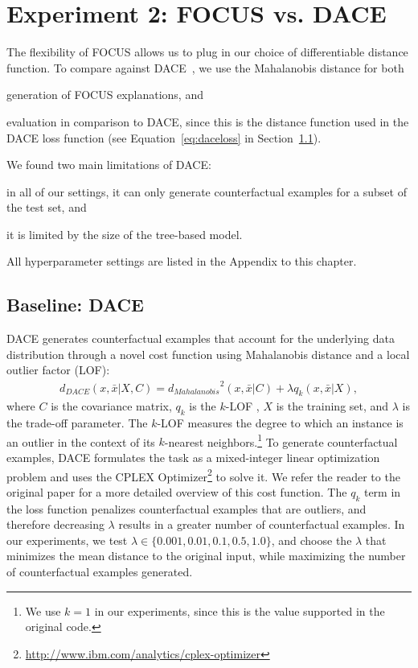 

\section{Experiment 2: FOCUS vs. DACE}
\label{section:experiment2}
The flexibility of FOCUS allows us to plug in our choice of differentiable distance function. To compare against DACE~\citep{kanamori_dace_2020}, we use the Mahalanobis distance for both 
\begin{inparaenum}[(i)]
\item generation of FOCUS explanations, and
\item evaluation in comparison to DACE, since this is the distance function used in the DACE loss function (see Equation~\ref{eq:daceloss} in Section~\ref{section:baselinedace}). 
\end{inparaenum}

We found two main limitations of DACE:
\begin{inparaenum}[(i)]
	\item in all of our settings, it can only generate counterfactual examples for a subset of the test set, and
	\item it is limited by the size of the tree-based model. 
\end{inparaenum}
All hyperparameter settings are listed in the Appendix to this chapter. 


\subsection{Baseline: DACE}
\label{section:baselinedace}
DACE generates counterfactual examples that account for the underlying data distribution through a novel cost function using Mahalanobis distance and a local outlier factor (LOF):
\begin{align}
\label{eq:daceloss}
d_\mathit{DACE}(x, \bar{x}|X, C) = {d_\mathit{Mahalanobis}}^2(x, \bar{x}|C) + \lambda q_k(x, \bar{x}|X), 
\end{align}
where $C$ is the covariance matrix, $q_k$ is the $k$-LOF \citep{breunig_lof_2020}, $X$ is the training set, and $\lambda$ is the trade-off parameter. 
The $k$-LOF measures the degree to which an instance is an outlier in the context of its $k$-nearest neighbors.\footnote{We use $k=1$ in our experiments, since this is the value supported in the original code.}
To generate counterfactual examples, DACE formulates the task as a mixed-integer linear optimization problem and uses the CPLEX Optimizer\footnote{\url{http://www.ibm.com/analytics/cplex-optimizer}} to solve it. 
We refer the reader to the original paper for a more detailed overview of this cost function. 
The $q_k$ term in the loss function penalizes counterfactual examples that are outliers, and therefore decreasing $\lambda$ results in a greater number of counterfactual examples. 
In our experiments, we test $\lambda \in \{0.001, 0.01, 0.1, 0.5, 1.0\}$, and choose the $\lambda$ that minimizes the mean distance to the original input, while maximizing the number of counterfactual examples generated. 


